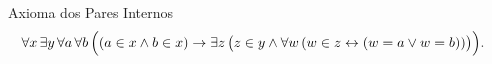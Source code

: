 \begin{displayaxiom}{Axioma dos Pares Internos}
    \[
        \begin{aligned}
            \forall x\, \exists y\, \forall a\, \forall b\, \Bigl(
                &(a \in x \land b \in x) 
                \rightarrow \exists z\, \bigl(
                    z \in y
                    \land
                    \forall w\, (w \in z \leftrightarrow (w = a \lor w = b))
                \bigr)
            \Bigr).
        \end{aligned}
    \]
\end{displayaxiom}
